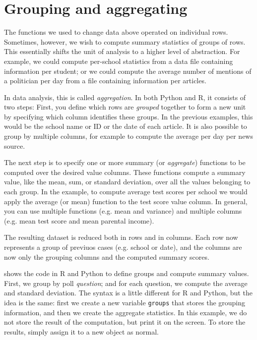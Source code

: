 \section{Grouping and aggregating} \label{sec:grouping}

The functions we used to change data above operated on individual rows.
Sometimes, however, we wish to compute summary statistics of groups of rows.
This essentially shifts the unit of analysis to a higher level of abstraction.
For example, we could compute per-school statistics from a data file containing information per student;
or we could compute the average number of mentions of a politician per day from a file containing information per articles.

In data analysis, this is called \emph{aggregation}.
In both Python and R, it consists of two steps:
First, you define which rows are \emph{grouped} together to form a new unit
by specifying which column identifies these groups.
In the previous examples, this would be the school name or ID or the date of each article.
It is also possible to group by multiple columns, for example to compute the average per day per news source.

The next step is to specify one or more summary (or \emph{aggregate}) functions to be computed over the desired value columns.
These functions compute a summary value, like the mean, sum, or standard deviation, over all the values belonging to each group.
In the example, to compute average test scores per school we would apply the average (or mean) function to the test score value column.
In general, you can use multiple functions (e.g.  mean and variance) and multiple columns (e.g. mean test score and mean parental income).

The resulting dataset is reduced both in rows and in columns.
Each row now represents a group of previuos cases (e.g. school or date),
and the columns are now only the grouping columns and the computed summary scores.

 shows the code in R and Python to define groups and compute summary values.
First, we group by poll \emph{question}; and for each question, we compute the average and standard deviation.
The syntax is a little different for R and Python, but the idea is the same:
first we create a new variable \verb+groups+ that stores the grouping information,
and then we create the aggregate statistics.
In this example, we do not store the result of the computation, but print it on the screen.
To store the results, simply assign it to a new object as normal.

